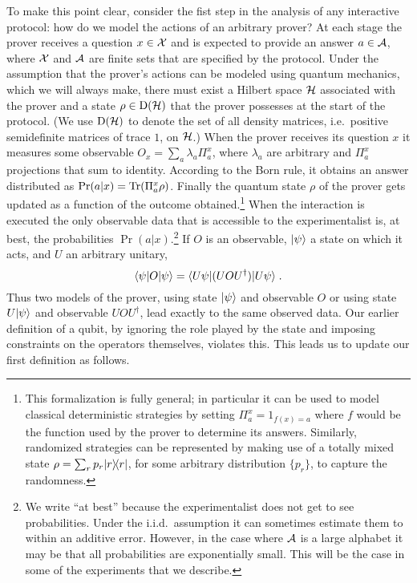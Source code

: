 To make this point clear, consider the fist step in the analysis of any interactive protocol: how do we model the actions of an arbitrary prover? At each stage the prover receives a question $x\in \mathcal{X}$ and is expected to provide an answer $a\in\mathcal{A}$, where $\mathcal{X}$ and $\mathcal{A}$ are finite sets that are specified by the protocol. Under the assumption that the prover's actions can be modeled using quantum mechanics, which we will always make, there must exist a Hilbert space $\mathcal{H}$  associated with the prover and a state $\rho \in \mathrm{D}(\mathcal{H})$ that the prover possesses at the start of the protocol. (We use $\mathrm{D}(\mathcal{H})$ to denote the set of all density matrices, i.e.\ positive semidefinite matrices of trace $1$, on $\mathcal{H}$.)
When the prover receives its question $x$ it measures some observable $O_x = \sum_a \lambda_a \Pi^x_a$, where $\lambda_a$ are arbitrary and $\Pi^x_a$ projections that sum to identity. According to the Born rule, it obtains an answer distributed as $\Pr(a|x) = \mbox{\rm Tr}(\Pi^x_a \rho)$.
 Finally the quantum state $\rho$ of the prover gets updated as a function of the outcome obtained.\footnote{This formalization is fully general; in particular it can be used to model classical deterministic strategies by setting $\Pi^x_a = 1_{f(x)=a}$ where $f$ would be the function used by the prover to determine its answers. Similarly, randomized strategies can be represented by making use  of a totally mixed state $\rho = \sum_r p_r |r\rangle\!\langle r|$, for some arbitrary distribution $\{p_r\}$, to capture the randomness.}
When the interaction is executed the only observable data that is accessible to the experimentalist is, at best, the probabilities $\Pr(a|x)$.\footnote{We write ``at best'' because the experimentalist does not get to see probabilities. Under the i.i.d.\ assumption it can sometimes estimate them to within an additive error. However, in the case where $\mathcal{A}$ is a large alphabet it may be that all probabilities are exponentially small. This will be the case in some of the experiments that we describe.}
If $O$ is an observable, $|\psi\rangle$ a state on which it acts, and $U$ an arbitrary unitary,
\[ \langle\psi| O |\psi\rangle =\langle U\psi|  (UOU^\dagger) |U\psi\rangle\;.\]
Thus two models of the prover, using state $|\psi\rangle$ and observable $O$ or using state $U |\psi\rangle$ and observable $UOU^\dagger$, lead exactly to the same observed data. Our earlier definition of a qubit, by ignoring the role played by the state and imposing constraints on the operators themselves, violates this. This leads us to update our first definition as follows. 

